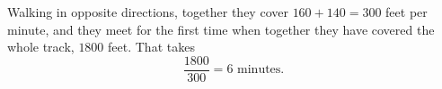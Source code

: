 Walking in opposite directions, together they cover $160+140=300$ feet per minute, and they meet for the first time when together they have covered the whole track, $1800$ feet. That takes
\[
\dfrac{1800}{300}=\boxed{6}\text{ minutes}.
\]
